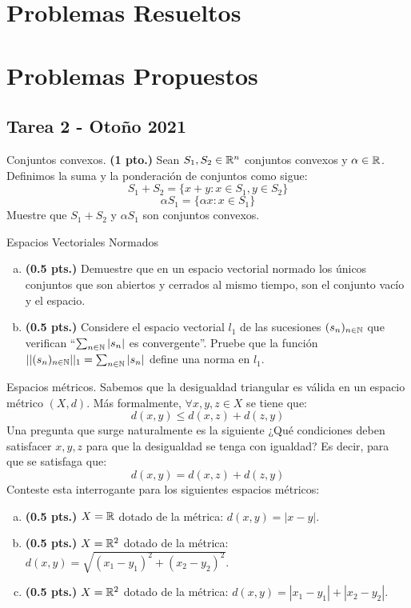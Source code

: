 
\section{Problemas Resueltos}

\section{Problemas Propuestos}

\subsection{Tarea 2 - Otoño 2021}

\begin{problema}{Conjuntos convexos.}
	\textbf{(1 pto.)} Sean $S_1, S_2 \in \mathbb{R}^n$ conjuntos convexos y $\alpha \in \mathbb{R}$. Definimos la suma y la ponderación de conjuntos como sigue: 
	$$ S_1 + S_2 = \{ x + y : x \in S_1 , y \in S_2 \} $$ 
	$$ \alpha S_1 = \{ \alpha x : x \in S_1 \} $$ 
	Muestre que $S_1 + S_2$ y $\alpha S_1$ son conjuntos convexos. 
\end{problema}

\begin{problema}{Espacios Vectoriales Normados}
	\begin{enumerate}[(a)]
		\item \textbf{(0.5 pts.)} Demuestre que en un espacio vectorial normado los únicos conjuntos que son abiertos y cerrados al mismo tiempo, son el conjunto vacío y el espacio. 
		
		\item \textbf{(0.5 pts.)} Considere el espacio vectorial $l_1$ de las sucesiones $(s_n)_{n \in \mathbb{N}}$ que verifican ``$\sum_{n\in \mathbb{N}} |s_n|$ es convergente''. Pruebe que la función $||(s_n)_{n \in \mathbb{N}}||_1 = \sum_{n\in \mathbb{N}} |s_n|$ define una norma en $l_1$. 
	\end{enumerate}
\end{problema}

\begin{problema}{Espacios métricos.}
	Sabemos que la desigualdad triangular es válida en un espacio métrico $(X, d)$. Más formalmente, $\forall x, y, z \in X$ se tiene que: 
	$$ d(x, y ) \leq d(x, z) + d(z, y) $$ 
	Una pregunta que surge naturalmente es la siguiente ¿Qué condiciones deben satisfacer $x,y,z$ para que la desigualdad se tenga con igualdad? Es decir, para que se satisfaga que: 
	$$ d(x, y) = d(x, z) + d(z, y)$$ 
	Conteste esta interrogante para los siguientes espacios métricos: 
	
	\begin{enumerate}[(a)]
		\item \textbf{(0.5 pts.)} $X = \mathbb{R}$ dotado de la métrica: $d(x,y) = | x - y |$. 
		\item \textbf{(0.5 pts.)} $X = \mathbb{R}^2$ dotado de la métrica: $d(x, y) = \sqrt{(x_1 - y_1)^2 + (x_2 - y_2)^2}$. 
		\item \textbf{(0.5 pts.)} $X = \mathbb{R}^2$ dotado de la métrica: $d(x,y) = | x_1 - y_1 | + | x_2 - y_2 |$. 
	\end{enumerate}
\end{problema}

